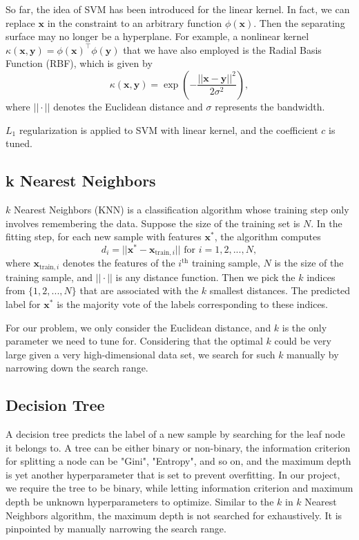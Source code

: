 \documentclass[10pt,twocolumn]{article}
\begin{document}
	So far, the idea of SVM has been introduced for the linear kernel. In fact, we can replace $\bm{x}$ in the constraint to an arbitrary function $\phi(\bm{x})$. Then the separating surface may no longer be a hyperplane. For example, a nonlinear kernel $\kappa(\bm{x},\bm{y}) = \phi(\bm{x})^\top \phi(\bm{y})$ that we have also employed is the Radial Basis Function (RBF), which is given by $$\kappa(\bm{x},\bm{y}) = \exp\left(-\frac{||\bm{x}-\bm{y}||^2}{2\sigma^2}\right),$$ where $||\cdot||$ denotes the Euclidean distance and $\sigma$ represents the bandwidth.  
	
	$L_1$ regularization is applied to SVM with linear kernel, and the coefficient $c$ is tuned. 
	\subsection{k Nearest Neighbors}
	$k$ Nearest Neighbors (KNN) is a classification algorithm whose training step only involves remembering the data. Suppose the size of the training set is $N$. In the fitting step, for each new sample with features $\bm{x}^*$, the algorithm computes $$d_i = ||\bm{x}^* - \bm{x}_{\text{train},i}|| \text{ for } i = 1,2,...,N,$$ where $\bm{x}_{\text{train},i}$ denotes the features of the $i^\text{th}$ training sample, $N$ is the size of the training sample, and $||\cdot||$ is any distance function. Then we pick the $k$ indices from $\{1,2,...,N\}$ that are associated with the $k$ smallest distances. The predicted label for $\bm{x}^*$ is the majority vote of the labels corresponding to these indices. 
	
	For our problem, we only consider the Euclidean distance, and $k$ is the only parameter we need to tune for. Considering that the optimal $k$ could be very large given a very high-dimensional data set, we search for such $k$ manually by narrowing down the search range.
	\subsection{Decision Tree}
	A decision tree predicts the label of a new sample by searching for the leaf node it belongs to. A tree can be either binary or non-binary, the information criterion for splitting a node can be "Gini", "Entropy", and so on, and the maximum depth is yet another hyperparameter that is set to prevent overfitting. In our project, we require the tree to be binary, while letting information criterion and maximum depth be unknown hyperparameters to optimize. Similar to the $k$ in $k$ Nearest Neighbors algorithm, the maximum depth is not searched for exhaustively. It is pinpointed by manually narrowing the search range.
\end{document}
